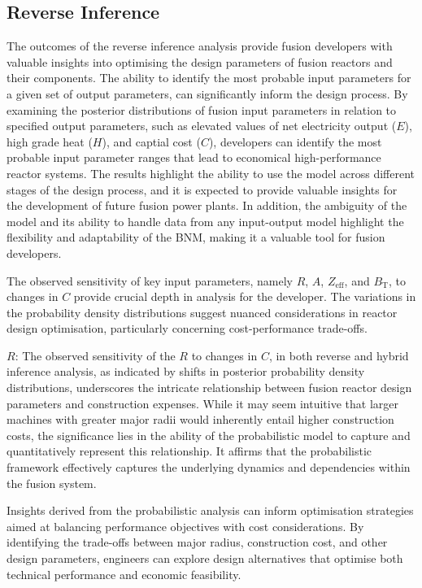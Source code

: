\documentclass[journal]{IEEEtran}
\begin{document}
\subsection{Reverse Inference}\label{sec:disc_reverse}

The outcomes of the reverse inference analysis provide fusion developers with valuable insights into optimising the design parameters of fusion reactors and their components. The ability to identify the most probable input parameters for a given set of output parameters, can significantly inform the design process. By examining the posterior distributions of fusion input parameters in relation to specified output parameters, such as elevated values of net electricity output ($E$), high grade heat ($H$), and captial cost ($C$), developers can identify the most probable input parameter ranges that lead to economical high-performance reactor systems. The results highlight the ability to use the model across different stages of the design process, and it is expected to provide valuable insights for the development of future fusion power plants. In addition, the ambiguity of the model and its ability to handle data from any input-output model highlight the flexibility and adaptability of the BNM, making it a valuable tool for fusion developers.

The observed sensitivity of key input parameters, namely $R$, $A$, $Z_{\text{eff}}$, and $B_{\text{T}}$, to changes in $C$ provide crucial depth in analysis for the developer. The variations in the probability density distributions suggest nuanced considerations in reactor design optimisation, particularly concerning cost-performance trade-offs. 

\textbf{$R$}: The observed sensitivity of the $R$ to changes in $C$, in both reverse and hybrid inference analysis, as indicated by shifts in posterior probability density distributions, underscores the intricate relationship between fusion reactor design parameters and construction expenses. While it may seem intuitive that larger machines with greater major radii would inherently entail higher construction costs, the significance lies in the ability of the probabilistic model to capture and quantitatively represent this relationship. It affirms that the probabilistic framework effectively captures the underlying dynamics and dependencies within the fusion system. 

Insights derived from the probabilistic analysis can inform optimisation strategies aimed at balancing performance objectives with cost considerations. By identifying the trade-offs between major radius, construction cost, and other design parameters, engineers can explore design alternatives that optimise both technical performance and economic feasibility.
\end{document}
